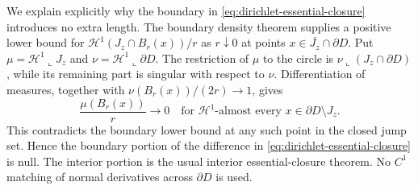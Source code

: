 We explain explicitly why the boundary in
\eqref{eq:dirichlet-essential-closure} introduces no extra length.
The boundary density theorem supplies a positive lower bound for
$\mathcal H^1(J_z\cap B_r(x))/r$ as $r\downarrow0$ at points
$x\in\overline{J_z}\cap\partial D$.
Put $\mu=\mathcal H^1\!\llcorner J_z$ and
$\nu=\mathcal H^1\!\llcorner\partial D$.
The restriction of $\mu$ to the circle is
$\nu\!\llcorner(J_z\cap\partial D)$, while its remaining part is
singular with respect to $\nu$.  Differentiation of measures, together
with $\nu(B_r(x))/(2r)\to1$, gives
\[
 \frac{\mu(B_r(x))}{r}\longrightarrow0
 \quad\text{for $\mathcal H^1$-almost every }
 x\in\partial D\setminus J_z.
\]
This contradicts the boundary lower bound at any such point in the
closed jump set.  Hence the boundary portion of the difference in
\eqref{eq:dirichlet-essential-closure} is null.  The interior portion
is the usual interior essential-closure theorem.  No $C^1$ matching
of normal derivatives across $\partial D$ is used.

